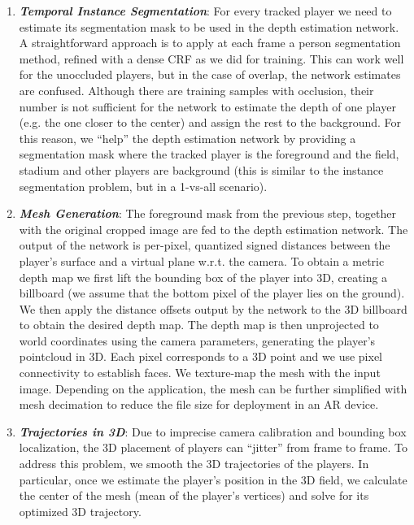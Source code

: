 \documentclass[11pt]{article}
\begin{document}
\begin{enumerate}
\item {\em \textbf{Temporal Instance Segmentation}}: For every tracked player we need to estimate its segmentation
mask to be used in the depth estimation network. A
straightforward approach is to apply at each frame a person
segmentation method, refined with a dense CRF as
we did for training. This can work well for the unoccluded
players, but in the case of overlap, the network estimates are
confused. Although there are training samples with occlusion,
their number is not sufficient for the network to estimate
the depth of one player (e.g. the one closer to the center)
and assign the rest to the background. For this reason,
we “help” the depth estimation network by providing a segmentation
mask where the tracked player is the foreground
and the field, stadium and other players are background (this
is similar to the instance segmentation problem, but
in a 1-vs-all scenario).

\item {\em \textbf{Mesh Generation}}: The foreground mask from the previous step, together
with the original cropped image are fed to the depth estimation network. The output of the network is per-pixel, quantized
signed distances between the player’s surface and a
virtual plane w.r.t. the camera. To obtain a metric depth
map we first lift the bounding box of the player into 3D,
creating a billboard (we assume that the bottom pixel of the
player lies on the ground). We then apply the distance offsets
output by the network to the 3D billboard to obtain the
desired depth map.
The depth map is then unprojected to world coordinates
using the camera parameters, generating the player’s pointcloud
in 3D. Each pixel corresponds to a 3D point and we
use pixel connectivity to establish faces. We texture-map
the mesh with the input image. Depending on the application,
the mesh can be further simplified with mesh decimation
to reduce the file size for deployment in an AR device.

\item {\em \textbf{Trajectories in 3D}}: Due to imprecise camera calibration and bounding box
localization, the 3D placement of players can “jitter” from
frame to frame. To address this problem, we smooth the 3D
trajectories of the players. In particular, once we estimate
the player’s position in the 3D field, we calculate the center
of the mesh (mean of the player’s vertices) and solve for its
optimized 3D trajectory.

\end{enumerate}
\end{document}
